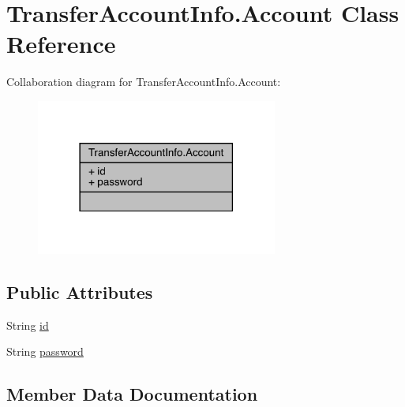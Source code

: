 \hypertarget{classcom_1_1toast_1_1android_1_1gamebase_1_1auth_1_1transfer_1_1data_1_1_transfer_account_info_1_1_account}{}\section{Transfer\+Account\+Info.\+Account Class Reference}
\label{classcom_1_1toast_1_1android_1_1gamebase_1_1auth_1_1transfer_1_1data_1_1_transfer_account_info_1_1_account}


Collaboration diagram for Transfer\+Account\+Info.\+Account\+:
\nopagebreak
\begin{figure}[H]
\begin{center}
\leavevmode
\includegraphics[width=225pt]{classcom_1_1toast_1_1android_1_1gamebase_1_1auth_1_1transfer_1_1data_1_1_transfer_account_info_1_1_account__coll__graph}
\end{center}
\end{figure}
\subsection*{Public Attributes}
\begin{DoxyCompactItemize}
\item 
String \hyperlink{classcom_1_1toast_1_1android_1_1gamebase_1_1auth_1_1transfer_1_1data_1_1_transfer_account_info_1_1_account_a76010eef1edc0406cc2375c25d2a433d}{id}
\item 
String \hyperlink{classcom_1_1toast_1_1android_1_1gamebase_1_1auth_1_1transfer_1_1data_1_1_transfer_account_info_1_1_account_acbd76b816d055b7a642c219fd9751020}{password}
\end{DoxyCompactItemize}


\subsection{Member Data Documentation}
\mbox{\label{classcom_1_1toast_1_1android_1_1gamebase_1_1auth_1_1transfer_1_1data_1_1_transfer_account_info_1_1_account_a76010eef1edc0406cc2375c25d2a433d}} 
